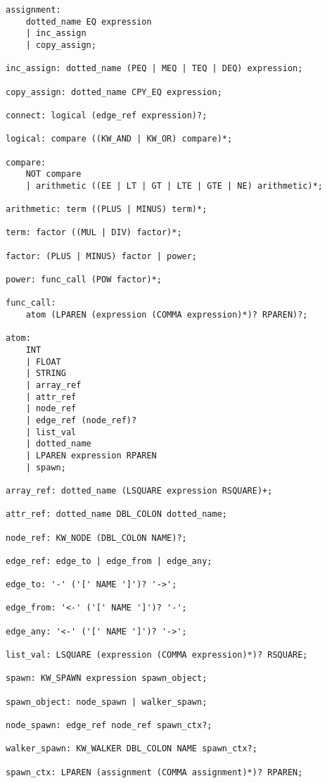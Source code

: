 \begin{lstlisting}[style=gram, numbers=none,
    captionpos=t, caption=Jac Language Grammar]
assignment:
    dotted_name EQ expression
    | inc_assign
    | copy_assign;

inc_assign: dotted_name (PEQ | MEQ | TEQ | DEQ) expression;

copy_assign: dotted_name CPY_EQ expression;

connect: logical (edge_ref expression)?;

logical: compare ((KW_AND | KW_OR) compare)*;

compare:
    NOT compare
    | arithmetic ((EE | LT | GT | LTE | GTE | NE) arithmetic)*;

arithmetic: term ((PLUS | MINUS) term)*;

term: factor ((MUL | DIV) factor)*;

factor: (PLUS | MINUS) factor | power;

power: func_call (POW factor)*;

func_call:
    atom (LPAREN (expression (COMMA expression)*)? RPAREN)?;

atom:
    INT
    | FLOAT
    | STRING
    | array_ref
    | attr_ref
    | node_ref
    | edge_ref (node_ref)?
    | list_val
    | dotted_name
    | LPAREN expression RPAREN
    | spawn;

array_ref: dotted_name (LSQUARE expression RSQUARE)+;

attr_ref: dotted_name DBL_COLON dotted_name;

node_ref: KW_NODE (DBL_COLON NAME)?;

edge_ref: edge_to | edge_from | edge_any;

edge_to: '-' ('[' NAME ']')? '->';

edge_from: '<-' ('[' NAME ']')? '-';

edge_any: '<-' ('[' NAME ']')? '->';

list_val: LSQUARE (expression (COMMA expression)*)? RSQUARE;

spawn: KW_SPAWN expression spawn_object;

spawn_object: node_spawn | walker_spawn;

node_spawn: edge_ref node_ref spawn_ctx?;

walker_spawn: KW_WALKER DBL_COLON NAME spawn_ctx?;

spawn_ctx: LPAREN (assignment (COMMA assignment)*)? RPAREN;
\end{lstlisting}


